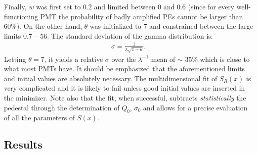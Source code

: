 \documentclass[a4paper,11pt]{article}
\begin{document}
Finally, $w$ was first set to 0.2 and limited between 0 and 0.6 (since for every well-functioning PMT the probability of badly amplified PEs cannot be larger than 60\%). 
On the other hand, $\theta$ was initialized to 7 and constrained between the large limits 0.7 -- 56. 
The standard deviation of the gamma distribution is: 
\begin{align}
\sigma = \frac{1}{\lambda\sqrt{1+\theta}}. 
\end{align}
Letting $\theta = 7$, it yields a relative $\sigma$ over the $\lambda^{-1}$ mean of $\sim$ 35\% which is close to what most PMTs have. 
It should be emphasized that the aforementioned limits and initial values are absolutely necessary. 
The multidimensional fit of $S_R(x)$ is very complicated and it is likely to fail unless good initial values are inserted in the minimizer. 
Note also that the fit, when successful, subtracts \emph{statistically} the pedestal through the determination of $Q_0$, $\sigma_0$ and allows for a precise evaluation of all the parameters of $S(x)$. 

\subsection{Results}
%
\end{document}
